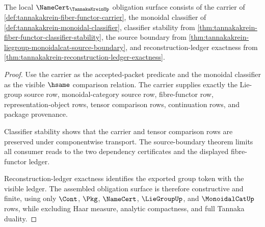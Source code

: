 \begin{theorem}
\label{thm:tannakakrein-namecert-obligation-surface}
The local $\NameCert_{\TannakaKreinUp}$ obligation surface consists of the
carrier of \autoref{def:tannakakrein-fiber-functor-carrier}, the monoidal
classifier of \autoref{def:tannakakrein-monoidal-classifier}, classifier
stability from
\autoref{thm:tannakakrein-fiber-functor-classifier-stability}, the source
boundary from
\autoref{thm:tannakakrein-liegroup-monoidalcat-source-boundary}, and
reconstruction-ledger exactness from
\autoref{thm:tannakakrein-reconstruction-ledger-exactness}.
\end{theorem}
\begin{proof}
Use the carrier as the accepted-packet predicate and the monoidal classifier
as the visible $\hsame$ comparison relation. The carrier supplies exactly the
Lie-group source row, monoidal-category source row, fibre-functor row,
representation-object rows, tensor comparison rows, continuation rows, and
package provenance.

Classifier stability shows that the carrier and tensor comparison rows are
preserved under componentwise transport. The source-boundary theorem limits
all consumer reads to the two dependency certificates and the displayed
fibre-functor ledger.

Reconstruction-ledger exactness identifies the exported group token with the
visible ledger. The assembled obligation surface is therefore constructive
and finite, using only $\Cont$, $\Pkg$, $\NameCert$, $\LieGroupUp$, and
$\MonoidalCatUp$ rows, while excluding Haar measure, analytic compactness, and
full Tannaka duality.
\end{proof}

